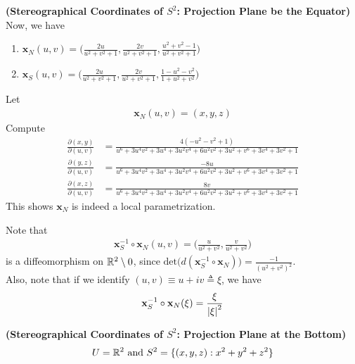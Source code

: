 \documentclass{report}
\begin{document}
\begin{mdframed}
\begin{Example}{\textbf{(Stereographical Coordinates of $S^2$: Projection Plane be the Equator)}}{}
Now, we have 
\begin{enumerate}[label=(\alph*)]
  \item $\textbf{x}_N(u,v)=\big(\frac{2u}{u^2+v^2+1},\frac{2v}{u^2+v^2+1},\frac{u^2+v^2-1}{u^2+v^2+1} \big)$
  \item $\textbf{x}_S(u,v)=\big(\frac{2u}{u^2+v^2+1},\frac{2v}{u^2+v^2+1},\frac{1-u^2-v^2}{1+u^2+v^2} \big)$
\end{enumerate}
Let
\begin{align*}
\textbf{x}_N(u,v)=(x,y,z)
\end{align*}
Compute 
\begin{align*}
  \frac{\partial (x,y)}{\partial (u,v)}&=\frac{4(-u^2 - v^2 + 1)}{u^6 + 3u^4v^2 + 3u^4 + 3u^2v^4 + 6u^2v^2 + 3u^2 + v^6 + 3v^4 + 3v^2 + 1}\\
  \frac{\partial (y,z)}{\partial (u,v)}&=\frac{-8u}{u^6 + 3u^4v^2 + 3u^4 + 3u^2v^4 + 6u^2v^2 + 3u^2 + v^6 + 3v^4 + 3v^2 + 1}\\
  \frac{\partial (x,z)}{\partial (u,v)}&=\frac{8v}{u^6 + 3u^4v^2 + 3u^4 + 3u^2v^4 + 6u^2v^2 + 3u^2 + v^6 + 3v^4 + 3v^2 + 1}
\end{align*}
This shows $\textbf{x}_N$ is indeed a local parametrization.   
\end{Example}
Note that 
\begin{align*}
\textbf{x}^{-1}_S \circ \textbf{x}_N (u,v)=\big( \frac{u}{u^2+v^2},\frac{v}{u^2+v^2}\big)
\end{align*}
is a diffeomorphism on $\mathbb{R}^2\setminus 0$, since $\text{det}\Big( d(\textbf{x}_S^{-1}\circ \textbf{x}_N)\Big)=\frac{-1}{(u^2+v^2)^2}$.\\

Also, note that if we identify $(u,v)\equiv u+iv\triangleq \xi$, we have 
\begin{align*}
\textbf{x}_S^{-1}\circ \textbf{x}_N (\xi)=\frac{\xi}{\left|\xi\right|^2}
\end{align*}
\end{mdframed}
\begin{mdframed}
\begin{Example}{\textbf{(Stereographical Coordinates of $S^2$: Projection Plane at the Bottom)}}{}
\begin{align*}
U=\mathbb{R}^2\text{ and }S^2=\{ (x,y,z):x^2+y^2+z^2 \}
\end{align*}
\end{Example}
\end{mdframed}
\end{document}
